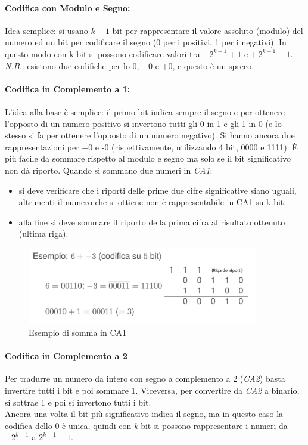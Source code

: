 \documentclass[class=book, crop=false]{standalone}
\begin{document}
\paragraph*{Codifica con Modulo e Segno:} Idea semplice: si usano $k-1$ bit per rappresentare il valore assoluto (modulo) del numero  ed un bit per codificare il segno (0 per i positivi, 1 per i negativi). In questo modo con k bit si possono codificare valori tra $-2^{k-1}+1 \text{ e} +2^{k-1}-1$.\\
\emph{N.B.}: esistono due codifiche per lo $0$, $-0$  e $+0$, e questo è un spreco.

\paragraph*{Codifica in Complemento a 1:} L’idea alla base è semplice: il primo bit indica sempre il segno e per ottenere l’opposto di un numero positivo si invertono tutti gli 0 in 1 e gli 1 in 0 (e lo stesso si fa per ottenere l’opposto di un numero negativo). Si hanno ancora due rappresentazioni per +0 e -0 (rispettivamente, utilizzando 4 bit, 0000 e 1111). È più facile da sommare rispetto al modulo e segno ma solo se il bit significativo non dà riporto.
Quando si sommano due numeri in \emph{CA1}:
\begin{itemize}[noitemsep]
	\item si deve verificare che i riporti delle prime due cifre significative siano uguali, altrimenti il numero che si ottiene non è rappresentabile in CA1 su k bit.
	\item alla fine si deve sommare il riporto della prima cifra al risultato ottenuto (ultima riga).
\end{itemize}

\begin{figure}[H]
	\centering
	\includegraphics[width=0.9\textwidth,keepaspectratio]{Somma-CA1.png}
	\caption{Esempio di somma in CA1}
\end{figure}

\paragraph*{Codifica in Complemento a 2} Per tradurre un numero da intero con segno a complemento a 2 (\emph{CA2}) basta invertire tutti i bit e poi sommare 1. Viceversa, per convertire da \emph{CA2} a binario, si sottrae 1 e poi si invertono tutti i bit. \\
Ancora una volta il bit più significativo indica il segno, ma in questo caso la codifica dello 0 è unica, quindi con \emph{k} bit si possono rappresentare i numeri da $-2^{k-1}$ a $2^{k-1}-1$.
\end{document}
